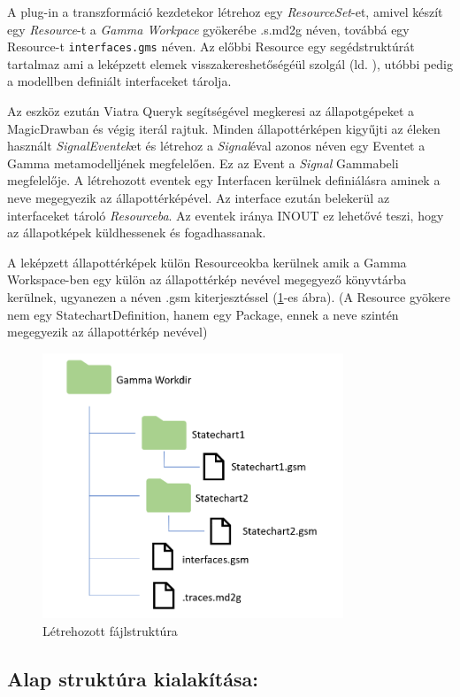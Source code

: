 A plug-in a transzformáció kezdetekor létrehoz egy \emph{ResourceSet}-et, amivel készít egy \emph{Resource}-t a \emph{Gamma Workpace} gyökerébe .s.md2g néven, továbbá egy Resource-t \verb+interfaces.gms+ néven. Az előbbi Resource egy segédstruktúrát tartalmaz ami a leképzett elemek visszakereshetőségéül szolgál (ld. ), utóbbi pedig a modellben definiált interfaceket tárolja.

Az eszköz ezután Viatra Queryk segítségével megkeresi az állapotgépeket a MagicDrawban és végig iterál rajtuk. Minden állapottérképen kigyűjti az éleken használt \emph{SignalEventek}et és létrehoz a \emph{Signal}éval azonos néven egy Eventet a Gamma metamodelljének megfelelően. Ez az Event a \emph{Signal} Gammabeli megfelelője.  A létrehozott eventek egy Interfacen kerülnek definiálásra aminek a neve megegyezik az állapottérképével. Az interface ezután belekerül az interfaceket tároló \emph{Resourceba}. Az eventek iránya INOUT ez lehetővé teszi, hogy az állapotképek küldhessenek és fogadhassanak.

A leképzett állapottérképek külön Resourceokba kerülnek amik a Gamma Workspace-ben egy külön az állapottérkép nevével megegyező könyvtárba kerülnek, ugyanezen a néven .gsm kiterjesztéssel (\ref{fig:filestructure}-es ábra). (A Resource gyökere nem egy StatechartDefinition, hanem egy Package, ennek a neve szintén megegyezik az állapottérkép nevével)

\begin{figure}[H]
	\centering
	\includegraphics[keepaspectratio, width=90mm]{figures/filestructure.png}
	\caption{Létrehozott fájlstruktúra}
	\label{fig:filestructure}
\end{figure}

\subsection{Alap struktúra kialakítása:}

